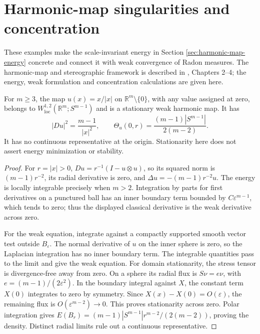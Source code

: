 \chapter{Harmonic-map singularities and concentration}\label{sec:examples-harmonic-energy}
These examples make the scale-invariant energy in Section \ref{sec:harmonic-map-energy} concrete and connect it with weak convergence of Radon measures. The harmonic-map and stereographic framework is described in \cite{Hel01}, Chapters 2--4; the energy, weak formulation and concentration calculations are given here.

\begin{example}\label{ex:radial-harmonic-hedgehog}
For $m\ge3$, the map $u(x)=x/|x|$ on $\mathbb R^m\setminus\{0\}$, with any value assigned at zero, belongs to $W^{1,2}_{\mathrm{loc}}(\mathbb R^m;S^{m-1})$ and is a stationary weak harmonic map. It has
\[
 |Du|^2=\frac{m-1}{|x|^2},\qquad
 \Theta_u(0,r)=\frac{(m-1)|S^{m-1}|}{2(m-2)}.
\]
It has no continuous representative at the origin. Stationarity here does not assert energy minimization or stability.
\end{example}
\begin{proof}
For $r=|x|>0$, $Du=r^{-1}(I-u\otimes u)$, so its squared norm is $(m-1)r^{-2}$, its radial derivative is zero, and $\Delta u=-(m-1)r^{-2}u$. The energy is locally integrable precisely when $m>2$. Integration by parts for first derivatives on a punctured ball has an inner boundary term bounded by $C\varepsilon^{m-1}$, which tends to zero; thus the displayed classical derivative is the weak derivative across zero.

For the weak equation, integrate against a compactly supported smooth vector test outside $B_\varepsilon$. The normal derivative of $u$ on the inner sphere is zero, so the Laplacian integration has no inner boundary term. The integrable quantities pass to the limit and give the weak equation. For domain stationarity, the stress tensor is divergence-free away from zero. On a sphere its radial flux is $S\nu=e\nu$, with $e=(m-1)/(2\varepsilon^2)$. In the boundary integral against $X$, the constant term $X(0)$ integrates to zero by symmetry. Since $X(x)-X(0)=O(\varepsilon)$, the remaining flux is $O(\varepsilon^{m-2})\to0$. This proves stationarity across zero. Polar integration gives $E(B_r)=(m-1)|S^{m-1}|r^{m-2}/(2(m-2))$, proving the density. Distinct radial limits rule out a continuous representative.
\end{proof}

